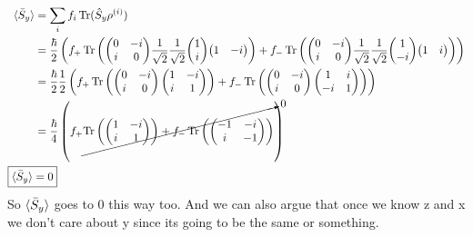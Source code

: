 \documentclass{jhwhw}
\DeclareMathOperator{\Tr}{Tr}
\begin{document}
\begin{align}
	\braket{\bar{S}_y} &= \sum \limits_i f_i \Tr (\hat{S}_y \rho^{(i)})
	\\
	&=
	\frac{\hbar}{2}\left(
	f_+ \Tr{\left( 
	{\begin{pmatrix}
		0	&	-i	\\
		i	&	0
	\end{pmatrix}}
	\frac{1}{\sqrt{2}}\frac{1}{\sqrt{2}}
	{\begin{pmatrix}
		1	\\
		i
	\end{pmatrix}}
	{\begin{pmatrix}
		1	&	-i
	\end{pmatrix}}
	\right)}
	+
	f_- \Tr{\left( 
	{\begin{pmatrix}
	    0	&	-i	\\
	    i	&	0
	\end{pmatrix}}
	\frac{1}{\sqrt{2}}\frac{1}{\sqrt{2}}
	{\begin{pmatrix}
		1	\\
		-i
	\end{pmatrix}}
	{\begin{pmatrix}
		1	&		i
	\end{pmatrix}}
	\right)}
	\right)
	\\
	&=
	\frac{\hbar}{2}\frac{1}{2}\left(
	f_+\Tr{\left( \begin{pmatrix}
		0	&	-i	\\
		i	&	0
	\end{pmatrix}
	{\begin{pmatrix}
	   1    &   -i   \\
	   i    &   1
	\end{pmatrix}}
	\right)}
	+
	f_-\Tr{\left(\begin{pmatrix}
		0	&	-i	\\
		i	&	0
	\end{pmatrix}
	{\begin{pmatrix}
	   1    &   i   \\
	   -i    &   1
	\end{pmatrix}}
	\right)}
	\right)
	\\
	&=
	\frac{\hbar}{4}\left(
	f_+
	\cancelto{0}
	{\Tr{\left( \begin{pmatrix}
		1	&	-i	\\
		i	&	1
	\end{pmatrix}
	\right)}
	+
	f_-
	\Tr{\left(\begin{pmatrix}
		-1	&	-i	\\
		i	&	-1
	\end{pmatrix}
	\right)}}
	\right)
	\\
	\Aboxed{\braket{\bar{S}_y} &= 0}
\end{align}
So $\braket{\bar{S}_y}$ goes to 0 this way too.  And we can also argue that once we know z and x we don't care about y since its going to be the same or something.
\end{document}
